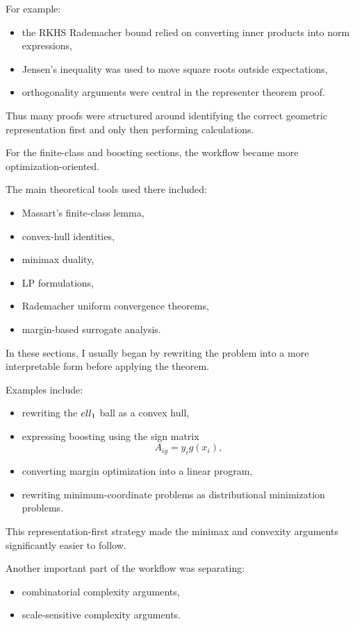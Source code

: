 \documentclass[11pt]{article}
\begin{document}
\begin{enumerate}
\begin{solutionbox}
For example:
\begin{itemize}
    \item the RKHS Rademacher bound relied on converting inner products into norm expressions,
    \item Jensen's inequality was used to move square roots outside expectations,
    \item orthogonality arguments were central in the representer theorem proof.
\end{itemize}

Thus many proofs were structured around identifying the correct geometric representation first and only then performing calculations.

\medskip

For the finite-class and boosting sections, the workflow became more optimization-oriented.

The main theoretical tools used there included:
\begin{itemize}
    \item Massart's finite-class lemma,
    \item convex-hull identities,
    \item minimax duality,
    \item LP formulations,
    \item Rademacher uniform convergence theorems,
    \item margin-based surrogate analysis.
\end{itemize}

In these sections, I usually began by rewriting the problem into a more interpretable form before applying the theorem.

Examples include:
\begin{itemize}
    \item rewriting the $\\ell_1$ ball as a convex hull,
    \item expressing boosting using the sign matrix
    \[
    A_{ig}=y_ig(x_i),
    \]
    \item converting margin optimization into a linear program,
    \item rewriting minimum-coordinate problems as distributional minimization problems.
\end{itemize}

This representation-first strategy made the minimax and convexity arguments significantly easier to follow.

\medskip

Another important part of the workflow was separating:
\begin{itemize}
    \item combinatorial complexity arguments,
    \item scale-sensitive complexity arguments.
\end{itemize}


\end{solutionbox}
\end{enumerate}
\end{document}
